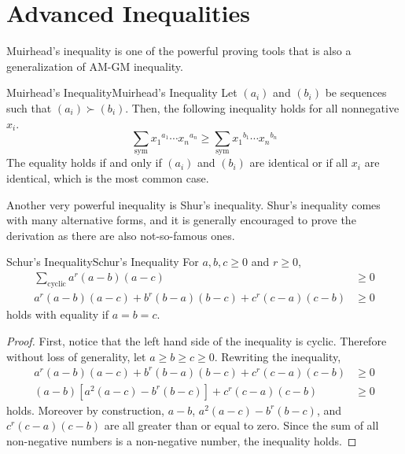 \documentclass[../../../main.tex]{subfiles}
\begin{document}
\section{Advanced Inequalities}




Muirhead's inequality is one of the powerful proving tools that is
also a generalization of AM-GM inequality.

\begin{theorem}{Muirhead's Inequality}{Muirhead's Inequality}
Let $(a_i)$ and $(b_i)$ be sequences such that $(a_i) \succ (b_i)$.
Then, the following inequality holds for all nonnegative $x_i$.
\[
\sum_\text{sym} {x_1}^{a_1} \cdots {x_n}^{a_n} 
\geq \sum_\text{sym} {x_1}^{b_1} \cdots {x_n}^{b_n}
\]
The equality holds if and only if $(a_i)$ and $(b_i)$ are identical
or if all $x_i$ are identical, which is the most common case.
\end{theorem}






Another very powerful inequality is Shur's inequality.
Shur's inequality comes with many alternative forms, and it is
generally encouraged to prove the derivation as there are also
not-so-famous ones.

\begin{theorem}{Schur's Inequality}{Schur's Inequality}
For $a, b, c \geq 0$ and $r \geq 0$,
\begin{align*}
    \sum_\text{cyclic} a^r(a - b)(a - c)
    &\geq 0 \\
    a^r(a - b)(a - c) + b^r(b - a)(b - c) + c^r(c - a)(c - b)
    &\geq 0
\end{align*}
holds with equality if $a = b = c$.
\end{theorem}
\begin{proof}
First, notice that the left hand side of the inequality is cyclic.
Therefore without loss of generality, let $a \geq b \geq c \geq 0$.
Rewriting the inequality,
\begin{align*}
    a^r(a - b)(a - c) + b^r(b - a)(b - c) + c^r(c - a)(c - b)
    &\geq 0 \\
    (a - b)\left[ a^2(a - c) - b^r(b - c) \right] + c^r(c - a)(c - b)
    &\geq 0
\end{align*}
holds. Moreover by construction, $a - b$, $a^2(a - c) - b^r(b - c)$,
and $c^r(c - a)(c - b)$ are all greater than or equal to zero.
Since the sum of all non-negative numbers is a non-negative number,
the inequality holds.
\end{proof}
\end{document}
